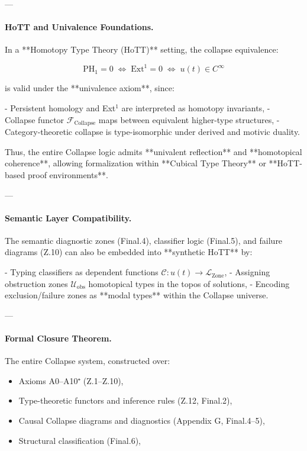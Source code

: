 \documentclass[11pt]{article}
\begin{document}
\begin{axiom}
\begin{axiom}
{{---

\paragraph{HoTT and Univalence Foundations.}  
In a **Homotopy Type Theory (HoTT)** setting, the collapse equivalence:

\[
\mathrm{PH}_1 = 0 \;\Leftrightarrow\; \mathrm{Ext}^1 = 0 \;\Leftrightarrow\; u(t) \in C^\infty
\]

is valid under the **univalence axiom**, since:

- Persistent homology and Ext$^1$ are interpreted as homotopy invariants,
- Collapse functor \(\mathcal{F}_{\text{Collapse}}\) maps between equivalent higher-type structures,
- Category-theoretic collapse is type-isomorphic under derived and motivic duality.

Thus, the entire Collapse logic admits **univalent reflection** and **homotopical coherence**,  
allowing formalization within **Cubical Type Theory** or **HoTT-based proof environments**.

---

\paragraph{Semantic Layer Compatibility.}  
The semantic diagnostic zones (Final.4), classifier logic (Final.5), and failure diagrams (Z.10)  
can also be embedded into **synthetic HoTT** by:

- Typing classifiers as dependent functions \( \mathcal{C} : u(t) \to \mathcal{L}_{\text{Zone}} \),
- Assigning obstruction zones \( \mathcal{U}_{\mathrm{obs}} \) homotopical types in the topos of solutions,
- Encoding exclusion/failure zones as **modal types** within the Collapse universe.

---

\paragraph{Formal Closure Theorem.}  
The entire Collapse system, constructed over:

\begin{itemize}
  \item Axioms A0–A10⁺ (Z.1–Z.10),
  \item Type-theoretic functors and inference rules (Z.12, Final.2),
  \item Causal Collapse diagrams and diagnostics (Appendix G, Final.4–5),
  \item Structural classification (Final.6),
\end{itemize}

}}
\end{axiom}
\end{axiom}
\end{document}
